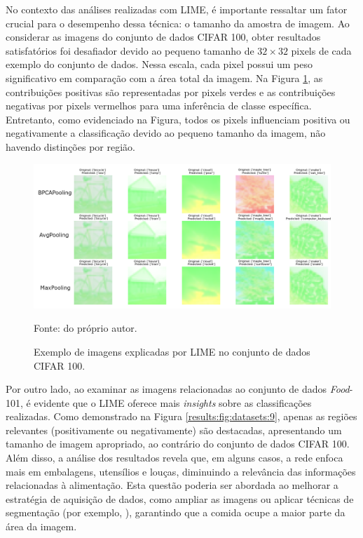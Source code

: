No contexto das análises realizadas com LIME, é importante ressaltar um fator crucial para o desempenho dessa técnica: o tamanho da amostra de imagem. Ao considerar as imagens do conjunto de dados CIFAR 100, obter resultados satisfatórios foi desafiador devido ao pequeno tamanho de $32 \times 32$ pixels de cada exemplo do conjunto de dados. Nessa escala, cada pixel possui um peso significativo em comparação com a área total da imagem. Na Figura \ref{results:fig:datasets:8}, as contribuições positivas são representadas por pixels verdes e as contribuições negativas por pixels vermelhos para uma inferência de classe específica. Entretanto, como evidenciado na Figura, todos os pixels influenciam positiva ou negativamente a classificação devido ao pequeno tamanho da imagem, não havendo distinções por região.

\begin{figure}[H]
    \centering
    \caption{Exemplo de imagens explicadas por LIME no conjunto de dados CIFAR 100.}
    \label{results:fig:datasets:8}
    \includegraphics[width=1\textwidth]{recursos/imagens/results/lime_explanations_cifar.png}

    Fonte: do próprio autor.
\end{figure}

Por outro lado, ao examinar as imagens relacionadas ao conjunto de dados \textit{Food}-101, é evidente que o LIME oferece mais \textit{insights} sobre as classificações realizadas. Como demonstrado na Figura \ref{results:fig:datasets:9}, apenas as regiões relevantes (positivamente ou negativamente) são destacadas, apresentando um tamanho de imagem apropriado, ao contrário do conjunto de dados CIFAR 100. Além disso, a análise dos resultados revela que, em alguns casos, a rede enfoca mais em embalagens, utensílios e louças, diminuindo a relevância das informações relacionadas à alimentação. Esta questão poderia ser abordada ao melhorar a estratégia de aquisição de dados, como ampliar as imagens ou aplicar técnicas de segmentação (por exemplo, \cite{rother2004grabcut}), garantindo que a comida ocupe a maior parte da área da imagem.

